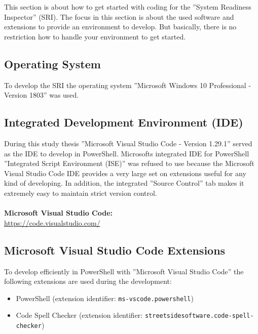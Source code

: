 
\thispagestyle{plain}
\renewcommand\section{\stdsection}
\setcounter{section}{2}
This section is about how to get started with coding for the ''System Readiness Inspector'' (SRI). The focus in this section is about the used software and extensions to provide an environment to develop. But basically, there is no restriction how to handle your environment to get started.

\subsection{Operating System}
To develop the SRI the operating system ''Microsoft Windows 10 Professional - Version 1803'' was used.

\subsection{Integrated Development Environment (IDE)}
During this study thesis ''Microsoft Visual Studio Code - Version 1.29.1'' served as the IDE to develop in PowerShell. Microsofts integrated IDE for PowerShell ''Integrated Script Environment (ISE)'' was refused to use because the Microsoft Visual Studio Code IDE provides a very large set on extensions useful for any kind of developing. In addition, the integrated ''Source Control'' tab makes it extremely easy to maintain strict version control. 
\\\\
\textbf{Microsoft Visual Studio Code:} 
\\
\url{https://code.visualstudio.com/}

\subsection{Microsoft Visual Studio Code Extensions}
To develop efficiently in PowerShell with ''Microsoft Visual Studio Code'' the following extensions are used during the development:
\begin{itemize}
    \item PowerShell (extension identifier: \lstinline|ms-vscode.powershell|)
    \item Code Spell Checker (extension identifier: \lstinline|streetsidesoftware.code-spell-checker|)
\end{itemize}